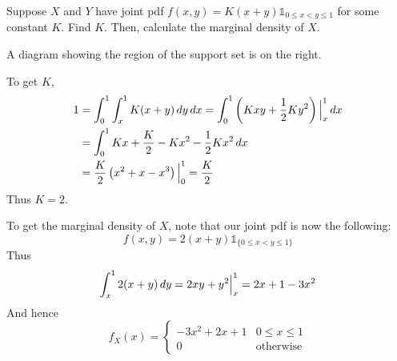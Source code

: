 \documentclass[notoc,notitlepage]{tufte-book}
\begin{document}
\begin{eg}[Example 3.11]\label{eg:3_11}
  Suppose $X$ and $Y$ have joint pdf $f(x, y) = K(x + y) \mathbb{1}_{0 \leq x < y \leq 1}$ for some constant $K$. Find $K$. Then, calculate the marginal density of $X$.
  \pagebreak

  \begin{solution}
  A diagram showing the region of the support set is on the right.

  To get $K$,
  \begin{align*}
    1 &= \int_{0}^{1} \int_{x}^{1} K(x + y) \mathop{}\!d{y} \mathop{}\!d{x} = \int_{0}^{1} \left( Kxy + \frac{1}{2}Ky^2 \right) \Big|_{x}^{1} \mathop{}\!d{x} \\
      &= \int_{0}^{1} Kx + \frac{K}{2} - Kx^2 - \frac{1}{2}Kx^2 \mathop{}\!d{x} \\
      &= \frac{K}{2} \left( x^2 + x - x^3 \right) \Big|_{0}^{1} = \frac{K}{2}
  \end{align*}
  Thus $K = 2$.

  To get the marginal density of $X$, note that our joint pdf is now the following:
  \begin{equation*}
    f(x, y) = 2(x + y) \mathbb{1}_{\{0 \leq x < y \leq 1\}}
  \end{equation*}
  Thus
  \begin{equation*}
    \int_{x}^{1} 2(x + y) \mathop{}\!d{y} = 2xy + y^2 \Big|_{x}^{1} = 2x + 1 - 3x^2
  \end{equation*}
  And hence
  \begin{equation*}
    f_X(x) = \begin{cases}
      -3x^2 + 2x + 1 & 0 \leq x \leq 1 \\
      0 & \text{otherwise}
    \end{cases}
  \end{equation*}
  \end{solution}
\end{eg}
\end{document}
